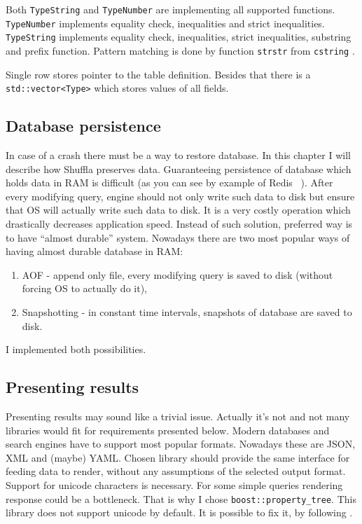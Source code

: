 \documentclass[10pt,a4paper]{article}
\begin{document}
Both \verb|TypeString| and \verb|TypeNumber| are implementing all supported functions. \verb|TypeNumber| implements equality check, inequalities and strict inequalities. \verb|TypeString| implements equality check, inequalities, strict inequalities, substring and prefix function. Pattern matching is done by function \verb|strstr| from \verb|cstring| \cite{STRSTR}.

Single row stores pointer to the table definition. Besides that there is a \verb|std::vector<Type>| which stores values of all fields.

\subsection{Database persistence}

In case of a crash there must be a way to restore database. In this chapter I will describe how Shuffla preserves data. Guaranteeing persistence of database which holds data in RAM is difficult (as you can see by example of Redis ~\cite{REDPE}). After every modifying query, engine should not only write such data to disk but ensure that OS will actually write such data to disk. It is a very costly operation which drastically decreases application speed. Instead of such solution, preferred way is to have “almost durable” system.
Nowadays there are two most popular ways of having almost durable database in RAM:

\begin{enumerate}
\item AOF - append only file, every modifying query is saved to disk (without forcing OS to actually do it),
\item Snapshotting - in constant time intervals, snapshots of database are saved to disk.
\end{enumerate}
I implemented both possibilities. 

\subsection{Presenting results}

Presenting results may sound like a trivial issue. Actually it's not and not many libraries would fit for requirements presented below. Modern databases and search engines have to support most popular formats. Nowadays these are JSON, XML and (maybe) YAML. Chosen library should provide the same interface for feeding data to render, without any assumptions of the selected output format. Support for unicode characters is necessary. For some simple queries rendering response could be a bottleneck. That is why I chose \verb|boost::property_tree|. This library does not support unicode by default. It is possible to fix it, by following \cite{SOANS} .
\end{document}
